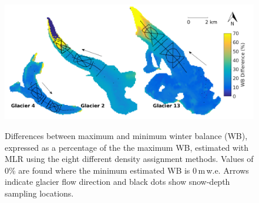 \documentclass{sfuthesis}
\newcommand{\topomap}{Arrows indicate glacier flow direction and black dots show snow-depth sampling locations. }
\begin{document}
 \begin{figure}[H]
	\centering
	\includegraphics[width =\textwidth]{MLR_SWEdifferenceMap_percent.png}\\
	\caption[Differences between maximum and minimum winter balance (WB), expressed as a percentage of the the maximum WB, estimated with MLR using the eight different density assignment methods]{Differences between maximum and minimum winter balance (WB), expressed as a percentage of the the maximum WB, estimated with MLR using the eight different density assignment methods. Values of 0\% are found where the minimum estimated WB is 0\,m\,w.e. \topomap}
	\label{fig:MLR_SWEdiffMapPercent}
\end{figure}
 
\end{document}
